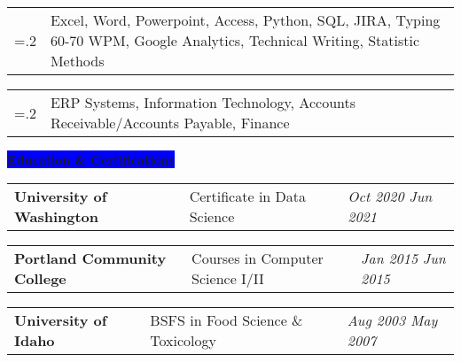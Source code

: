 \documentclass[letterpaper,12pt]{article}[leftmargin=*]
\newcommand{\education}[2]{\vspace{6pt}
  \colorbox{Blue}{\color{white}#1\hspace{9pt}\raggedbottom\normalsize\textbf{#2\hspace{4pt}}}
}
\newcommand{\resumeSectionStart}{\begin{itemize}[leftmargin=0.1in]}
\newcommand{\resumeSectionEnd}{\end{itemize}}
\newcommand{\resumeSkill}[2]{
  \vspace{-6pt}
  \item[]
    \begin{tabularx}{0.97\textwidth}{>{\hsize=.2\hsize}X X }
      {\textbf{#1}} & {\small#2} \\
    \end{tabularx}
}
\newcommand{\resumeEducation}[3]{
  \vspace{-6pt}
  \item[]
    \begin{tabularx}{0.97\textwidth}[t]{>{\raggedright}X >{\raggedright\arraybackslash}X >{\raggedleft\arraybackslash}X}
      \textbf{\color{primary}#1} & {\small#2} & \textit{\color{accent}\small#3} \\
    \end{tabularx}
}
\begin{document}
\resumeSectionStart{

  \resumeSkill{Proficient in}{Excel, Word, Powerpoint, Access, Python, SQL, JIRA, Typing 60-70 WPM, Google Analytics, Technical Writing, Statistic Methods}

  \resumeSkill{Familiar with}{ERP Systems, Information Technology, Accounts Receivable/Accounts Payable, Finance}


}
\resumeSectionEnd{}

\education{\faGraduationCap}{Education \& Certifications}

\resumeSectionStart{

  \resumeEducation{University of Washington}{Certificate in Data Science}{Oct 2020 \textemdash{} Jun 2021}

  \resumeEducation{Portland Community College}{Courses in Computer Science I/II}{Jan 2015 \textemdash{} Jun 2015}

  \resumeEducation{University of Idaho}{BSFS in Food Science \& Toxicology}{Aug 2003 \textemdash{} May 2007}

}
\resumeSectionEnd{}
\end{document}
